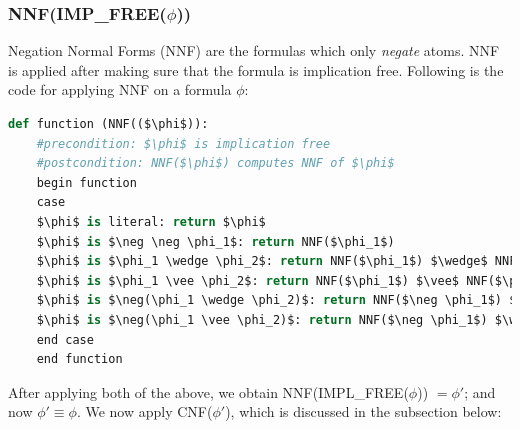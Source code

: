 \documentclass{report}
\begin{document}
\subsubsection{NNF(IMP\_FREE($\phi$))}
Negation Normal Forms (NNF) are the formulas which only \textit{negate} atoms. NNF is applied after making sure that the formula is implication free. Following is the code for applying NNF on a formula $\phi$: \\

\begin{lstlisting}[language=Python]
def function (NNF(($\phi$)):
    #precondition: $\phi$ is implication free
    #postcondition: NNF($\phi$) computes NNF of $\phi$
    begin function
    case 
    $\phi$ is literal: return $\phi$
    $\phi$ is $\neg \neg \phi_1$: return NNF($\phi_1$)
    $\phi$ is $\phi_1 \wedge \phi_2$: return NNF($\phi_1$) $\wedge$ NNF($\phi_2$)
    $\phi$ is $\phi_1 \vee \phi_2$: return NNF($\phi_1$) $\vee$ NNF($\phi_2$)
    $\phi$ is $\neg(\phi_1 \wedge \phi_2)$: return NNF($\neg \phi_1$) $\vee$ NNF($\neg \phi_2$)
    $\phi$ is $\neg(\phi_1 \vee \phi_2)$: return NNF($\neg \phi_1$) $\wedge$ NNF($\neg \phi_2$)
    end case
    end function
\end{lstlisting}
\par
After applying both of the above, we obtain NNF(IMPL\_FREE($\phi$)) $= \phi'$; and now $\phi' \equiv \phi$. We now apply CNF($\phi'$), which is discussed in the subsection below:
\end{document}
